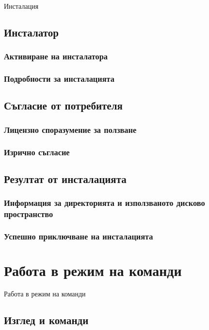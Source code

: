 \documentclass{beamer}
\begin{document}
\begin{frame}
\center \huge{Инсталация}
\end{frame}

\subsection{Инсталатор}

\begin{frame}
\frametitle{Активиране на инсталатора}
\end{frame}

\begin{frame}
\frametitle{Подробности за инсталацията}
\end{frame}

\subsection{Съгласие от потребителя}

\begin{frame}
\frametitle{Лицензно споразумение за ползване}
\end{frame}

\begin{frame}
\frametitle{Изрично съгласие}
\end{frame}

\subsection{Резултат от инсталацията}

\begin{frame}
\frametitle{Информация за директорията и използваното дисково пространство}
\end{frame}

\begin{frame}
\frametitle{Успешно приключване на инсталацията}
\end{frame}

\section{Работа в режим на команди}

\begin{frame}
\center \huge{Работа в режим на команди}
\end{frame}

\subsection{Изглед и команди}
\end{document}
